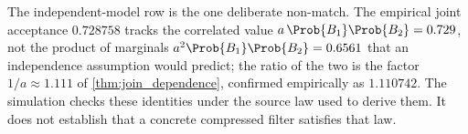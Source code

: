 \documentclass[ ../main.tex]{subfiles}
\begin{document}
The independent-model row is the one deliberate non-match. The empirical joint
acceptance $0.728758$ tracks the correlated value $a\,\Prob{B_1}\Prob{B_2} =
0.729$, not the product of marginals $a^2\Prob{B_1}\Prob{B_2} = 0.6561$ that an
independence assumption would predict; the ratio of the two is the factor $1/a
\approx 1.111$ of \cref{thm:join_dependence}, confirmed empirically as $1.110742$.
The simulation checks these identities under the source law used to derive
them. It does not establish that a concrete compressed filter satisfies that
law.
\end{document}
